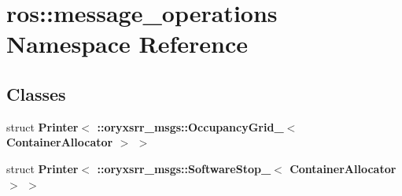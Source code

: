 \section{ros\-:\-:message\-\_\-operations \-Namespace \-Reference}
\label{namespaceros_1_1message__operations}
\subsection*{\-Classes}
\begin{DoxyCompactItemize}
\item 
struct {\bf \-Printer$<$ \-::oryxsrr\-\_\-msgs\-::\-Occupancy\-Grid\-\_\-$<$ Container\-Allocator $>$ $>$}
\item 
struct {\bf \-Printer$<$ \-::oryxsrr\-\_\-msgs\-::\-Software\-Stop\-\_\-$<$ Container\-Allocator $>$ $>$}
\end{DoxyCompactItemize}
